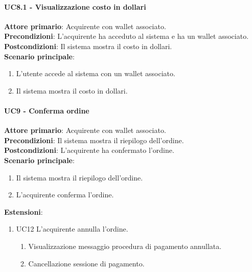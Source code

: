 \documentclass[a4paper, 12pt]{article}
\begin{document}
\paragraph{UC8.1 - Visualizzazione costo in dollari}
\textbf{Attore primario}: Acquirente con wallet associato.\\
\textbf{Precondizioni}: L'acquirente ha acceduto al sistema e ha un wallet associato.\\
\textbf{Postcondizioni}: Il sistema mostra il costo in dollari.\\
\textbf{Scenario principale}:
\begin{enumerate}
    \item L’utente accede al sistema con un wallet associato.
    \item Il sistema mostra il costo in dollari.
\end{enumerate}

\paragraph{UC9 - Conferma ordine}
\textbf{Attore primario}: Acquirente con wallet associato.\\
\textbf{Precondizioni}: Il sistema mostra il riepilogo dell'ordine.\\
\textbf{Postcondizioni}: L'acquirente ha confermato l'ordine.\\
\textbf{Scenario principale}:
\begin{enumerate}
    \item Il sistema mostra il riepilogo dell'ordine.
    \item L'acquirente conferma l'ordine.
\end{enumerate}
\textbf{Estensioni}:
\begin{enumerate}
    \item UC12 L'acquirente annulla l'ordine.
    \begin{enumerate}
        \item Visualizzazione messaggio procedura di pagamento annullata.
        \item Cancellazione sessione di pagamento.
    \end{enumerate}
\end{enumerate}
\end{document}
